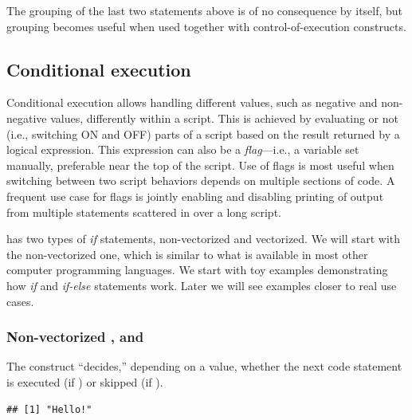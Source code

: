 \documentclass[krantz2]{krantz}\usepackage{knitr}
\begin{document}
The grouping of the last two statements above is of no consequence by itself, but grouping becomes useful when used together with control-of-execution constructs.

\subsection{Conditional execution}

Conditional execution allows handling different values, such as negative and non-negative values, differently within a script. This is achieved by evaluating or not (i.e., switching ON and OFF) parts of a script based on the result returned by a logical expression. This expression can also be a \emph{flag}---i.e., a  variable set manually, preferable near the top of the script. Use of flags is most useful when switching between two script behaviors depends on multiple sections of code. A frequent use case for flags is jointly enabling and disabling printing of output from multiple statements scattered in over a long script.

\Rpgrm has two types of \emph{if} statements, non-vectorized and vectorized. We will start with the non-vectorized one, which is similar to what is available in most other computer programming languages. We start with toy examples demonstrating how \emph{if} and \emph{if-else} statements work. Later we will see examples closer to real use cases.

\subsubsection[Non-vectorized \texttt{if}, \texttt{else} and \texttt{switch}]{Non-vectorized ,  and }
%

The  construct ``decides,'' depending on a  value, whether the next code statement is executed (if ) or skipped (if ).

\begin{knitrout}\footnotesize
{}\color{fgcolor}\begin{kframe}
\begin{alltt}
 \hlkwb{<-} 
  \hlstd{(}\hlstd{)}
\end{alltt}
\begin{verbatim}
## [1] "Hello!"
\end{verbatim}
\end{kframe}
\end{knitrout}
\end{document}

